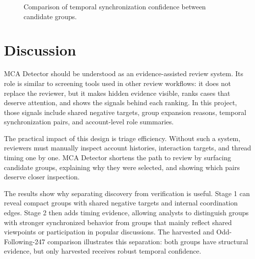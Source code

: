 \documentclass[conference]{IEEEtran}
\begin{document}
\begin{figure}[htbp]
\centering
{}
\caption{Comparison of temporal synchronization confidence between candidate groups.}
\label{fig:temporal-confidence}
\end{figure}

\section{Discussion}
MCA Detector should be understood as an evidence-assisted review system. Its role is similar to screening tools used in other review workflows: it does not replace the reviewer, but it makes hidden evidence visible, ranks cases that deserve attention, and shows the signals behind each ranking. In this project, those signals include shared negative targets, group expansion reasons, temporal synchronization pairs, and account-level role summaries.

The practical impact of this design is triage efficiency. Without such a system, reviewers must manually inspect account histories, interaction targets, and thread timing one by one. MCA Detector shortens the path to review by surfacing candidate groups, explaining why they were selected, and showing which pairs deserve closer inspection.

The results show why separating discovery from verification is useful. Stage 1 can reveal compact groups with shared negative targets and internal coordination edges. Stage 2 then adds timing evidence, allowing analysts to distinguish groups with stronger synchronized behavior from groups that mainly reflect shared viewpoints or participation in popular discussions. The harvested and Odd-Following-247 comparison illustrates this separation: both groups have structural evidence, but only harvested receives robust temporal confidence.
\end{document}
